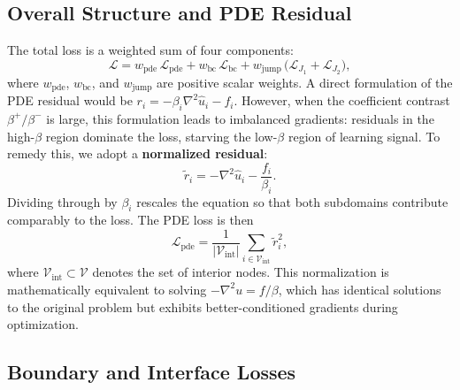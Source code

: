 \documentclass[11pt]{article}
\theoremstyle{definition}
\theoremstyle{remark}
\theoremstyle{plain}
\begin{document}
\subsection{Overall Structure and PDE Residual}

The total loss is a weighted sum of four components:
\begin{equation}
    \mathcal{L} = w_{\text{pde}} \, \mathcal{L}_{\text{pde}} + w_{\text{bc}} \, \mathcal{L}_{\text{bc}} + w_{\text{jump}} \, \bigl( \mathcal{L}_{J_1} + \mathcal{L}_{J_2} \bigr),
\end{equation}
where $w_{\text{pde}}$, $w_{\text{bc}}$, and $w_{\text{jump}}$ are positive scalar weights. A direct formulation of the PDE residual would be $r_i = -\beta_i \nabla^2 \hat{u}_i - f_i$. However, when the coefficient contrast $\beta^+ / \beta^-$ is large, this formulation leads to imbalanced gradients: residuals in the high-$\beta$ region dominate the loss, starving the low-$\beta$ region of learning signal. To remedy this, we adopt a \textbf{normalized residual}:
\begin{equation}
    \tilde{r}_i = -\nabla^2 \hat{u}_i - \frac{f_i}{\beta_i}.
\end{equation}
Dividing through by $\beta_i$ rescales the equation so that both subdomains contribute comparably to the loss. The PDE loss is then
\begin{equation}
    \mathcal{L}_{\text{pde}} = \frac{1}{|\mathcal{V}_{\text{int}}|} \sum_{i \in \mathcal{V}_{\text{int}}} \tilde{r}_i^2,
\end{equation}
where $\mathcal{V}_{\text{int}} \subset \mathcal{V}$ denotes the set of interior nodes. This normalization is mathematically equivalent to solving $-\nabla^2 u = f / \beta$, which has identical solutions to the original problem but exhibits better-conditioned gradients during optimization.

\subsection{Boundary and Interface Losses}
\end{document}
